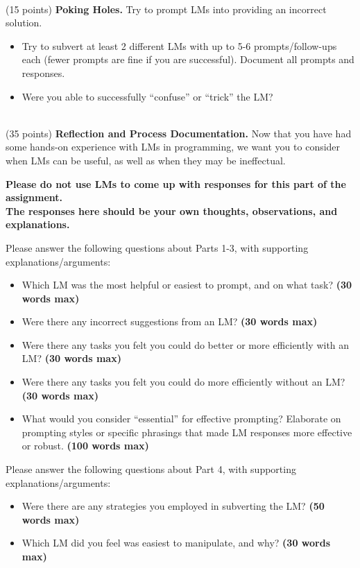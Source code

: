 \documentclass[a4 paper]{article}
\numberwithin{equation}{section}
\newcommand{\problem}[2]{~\\\fbox{\textbf{Part #1}}\hfill (#2 points)\newline\newline}
\newcommand{\solution}{~\newline\textbf{\textit{(Solution)}} }
\begin{document}
\problem{4}{15}
\textbf{Poking Holes.}
Try to prompt LMs into providing an incorrect solution.

\begin{itemize}
    \item Try to subvert at least 2 different LMs with up to 5-6 prompts/follow-ups each (fewer prompts are fine if you are successful). Document all prompts and responses.
    \item Were you able to successfully ``confuse'' or ``trick'' the LM?
\end{itemize}



\newpage
\problem{5}{35}
\textbf{Reflection and Process Documentation.}
Now that you have had some hands-on experience with LMs in programming, we want you to consider when LMs can be useful, as well as when they may be ineffectual.
\begin{center}
\textbf{Please do not use LMs to come up with responses for this part of the assignment.\\
The responses here should be your own thoughts, observations, and explanations.}
\end{center}


Please answer the following questions about Parts 1-3, with supporting explanations/arguments:
\begin{itemize}
    \item Which LM was the most helpful or easiest to prompt, and on what task? \textbf{(30 words max)}
    \item Were there any incorrect suggestions from an LM? \textbf{(30 words max)}
    \item Were there any tasks you felt you could do better or more efficiently with an LM? \textbf{(30 words max)}
    \item Were there any tasks you felt you could do more efficiently without an LM? \textbf{(30 words max)}
    \item What would you consider ``essential'' for effective prompting? Elaborate on prompting styles or specific phrasings that made LM responses more effective or robust. \textbf{(100 words max)}
    
\end{itemize}

Please answer the following questions about Part 4, with supporting explanations/arguments:
\begin{itemize}
    \item Were there are any strategies you employed in subverting the LM? \textbf{(50 words max)}
    \item Which LM did you feel was easiest to manipulate, and why? \textbf{(30 words max)}

\end{itemize}
\end{document}
